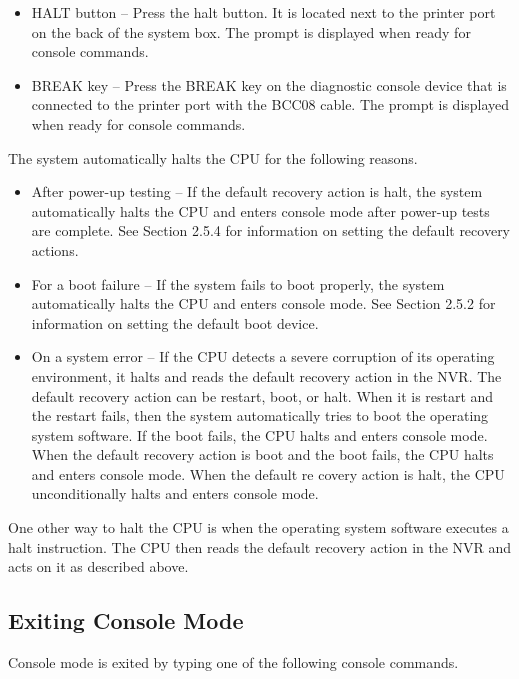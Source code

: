 \begin{itemize}
\item HALT button -- Press the halt button. It is located next to the printer port
on the back of the system box. The \console prompt is displayed when
ready for console commands.
\item BREAK key -- Press the BREAK key on the diagnostic console device
that is connected to the printer port with the BCC08 cable. The \console
prompt is displayed when ready for console commands.
\end{itemize}
The system automatically halts the CPU for the following reasons.
\begin{itemize}
\item After power-up testing -- If the default recovery action is halt, the system
automatically halts the CPU and enters console mode after power-up
tests are complete. See Section 2.5.4 for information on setting the
default recovery actions.
\item For a boot failure -- If the system fails to boot properly, the system 
automatically halts the CPU and enters console mode. See Section 2.5.2
for information on setting the default boot device.
\item On a system error -- If the CPU detects a severe corruption of its 
operating environment, it halts and reads the default recovery action in the
NVR. The default recovery action can be restart, boot, or halt. When
it is restart and the restart fails, then the system automatically tries to
boot the operating system software. If the boot fails, the CPU halts and
enters console mode. When the default recovery action is boot and the
boot fails, the CPU halts and enters console mode. When the default re
covery action is halt, the CPU unconditionally halts and enters console
mode.
\end{itemize}

One other way to halt the CPU is when the operating system software 
executes a halt instruction. The CPU then reads the default recovery action in
the NVR and acts on it as described above.

\subsection{Exiting Console Mode}

Console mode is exited by typing one of the following console commands.

